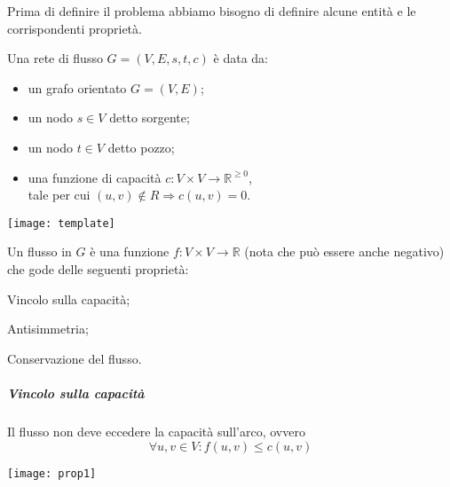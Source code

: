 Prima di definire il problema abbiamo bisogno di definire alcune entità e le corrispondenti proprietà.

\begin{minipage}[b]{.5\linewidth}
	\begin{definition}
	Una rete di flusso \(G = (V,E,s,t,c)\) è data da:
	\begin{itemize}
		\item un grafo orientato \(G = (V,E)\);
		\item un nodo \(s \in V\) detto \alert{sorgente};
		\item un nodo \(t \in V\) detto \alert{pozzo};
		\item una funzione di \alert{capacità} \(c \colon V \times V \to \mathbb{R}^{\geqslant 0}\),\\tale per cui \((u,v) \not\in R \Rightarrow c(u,v) = 0\).
	\end{itemize}
	\end{definition}
\end{minipage}
\begin{minipage}[b]{.5\linewidth}
	\texttt{[image: template]}
\end{minipage}

\begin{definition}
Un flusso in \(G\) è una funzione \(f\colon V \times V \to \mathbb{R}\) (nota che può essere anche negativo) che gode delle seguenti proprietà:
\begin{semicompactlist}
	\item Vincolo sulla capacità;
	\item Antisimmetria;
	\item Conservazione del flusso.
\end{semicompactlist}
\end{definition}

\begin{minipage}{.5\linewidth}
	\subparagraph{Vincolo sulla capacità}
	Il flusso non deve eccedere la capacità sull'arco, ovvero
	\begin{equation*}
	\forall u,v \in V: f(u,v) \leqslant c(u,v)
	\end{equation*}
\end{minipage}
\begin{minipage}{.5\linewidth}
\centering
\texttt{[image: prop1]}
\end{minipage}

